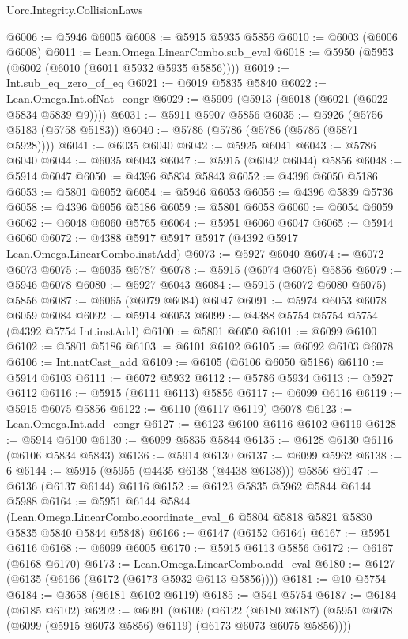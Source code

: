 \begin{lexlean}{Uorc.Integrity.CollisionLaws}
\begin{coremodule}
@6006 := @5946 @6005
@6008 := @5915 @5935 @5856
@6010 := @6003 (@6006 @6008)
@6011 := Lean.Omega.LinearCombo.sub_eval
@6018 := @5950 (@5953 (@6002 (@6010 (@6011 @5932 @5935 @5856))))
@6019 := Int.sub_eq_zero_of_eq
@6021 := @6019 @5835 @5840
@6022 := Lean.Omega.Int.ofNat_congr
@6029 := @5909 (@5913 (@6018 (@6021 (@6022 @5834 @5839 @9))))
@6031 := @5911 @5907 @5856
@6035 := @5926 (@5756 @5183 (@5758 @5183))
@6040 := @5786 (@5786 (@5786 (@5786 (@5871 @5928))))
@6041 := @6035 @6040
@6042 := @5925 @6041
@6043 := @5786 @6040
@6044 := @6035 @6043
@6047 := @5915 (@6042 @6044) @5856
@6048 := @5914 @6047
@6050 := @4396 @5834 @5843
@6052 := @4396 @6050 @5186
@6053 := @5801 @6052
@6054 := @5946 @6053
@6056 := @4396 @5839 @5736
@6058 := @4396 @6056 @5186
@6059 := @5801 @6058
@6060 := @6054 @6059
@6062 := @6048 @6060 @5765
@6064 := @5951 @6060 @6047
@6065 := @5914 @6060
@6072 := @4388 @5917 @5917 @5917 (@4392 @5917 Lean.Omega.LinearCombo.instAdd)
@6073 := @5927 @6040
@6074 := @6072 @6073
@6075 := @6035 @5787
@6078 := @5915 (@6074 @6075) @5856
@6079 := @5946 @6078
@6080 := @5927 @6043
@6084 := @5915 (@6072 @6080 @6075) @5856
@6087 := @6065 (@6079 @6084) @6047
@6091 := @5974 @6053 @6078 @6059 @6084
@6092 := @5914 @6053
@6099 := @4388 @5754 @5754 @5754 (@4392 @5754 Int.instAdd)
@6100 := @5801 @6050
@6101 := @6099 @6100
@6102 := @5801 @5186
@6103 := @6101 @6102
@6105 := @6092 @6103 @6078
@6106 := Int.natCast_add
@6109 := @6105 (@6106 @6050 @5186)
@6110 := @5914 @6103
@6111 := @6072 @5932
@6112 := @5786 @5934
@6113 := @5927 @6112
@6116 := @5915 (@6111 @6113) @5856
@6117 := @6099 @6116
@6119 := @5915 @6075 @5856
@6122 := @6110 (@6117 @6119) @6078
@6123 := Lean.Omega.Int.add_congr
@6127 := @6123 @6100 @6116 @6102 @6119
@6128 := @5914 @6100
@6130 := @6099 @5835 @5844
@6135 := @6128 @6130 @6116 (@6106 @5834 @5843)
@6136 := @5914 @6130
@6137 := @6099 @5962
@6138 := 6
@6144 := @5915 (@5955 (@4435 @6138 (@4438 @6138))) @5856
@6147 := @6136 (@6137 @6144) @6116
@6152 := @6123 @5835 @5962 @5844 @6144 @5988
@6164 := @5951
    @6144
    @5844
    (Lean.Omega.LinearCombo.coordinate_eval_6 @5804 @5818 @5821 @5830 @5835 @5840 @5844 @5848)
@6166 := @6147 (@6152 @6164)
@6167 := @5951 @6116
@6168 := @6099 @6005
@6170 := @5915 @6113 @5856
@6172 := @6167 (@6168 @6170)
@6173 := Lean.Omega.LinearCombo.add_eval
@6180 := @6127 (@6135 (@6166 (@6172 (@6173 @5932 @6113 @5856))))
@6181 := @10 @5754
@6184 := @3658 (@6181 @6102 @6119)
@6185 := @541 @5754
@6187 := @6184 (@6185 @6102)
@6202 := @6091
    (@6109
      (@6122
        (@6180 @6187)
        (@5951 @6078 (@6099 (@5915 @6073 @5856) @6119) (@6173 @6073 @6075 @5856))))

\end{coremodule}
\end{lexlean}

